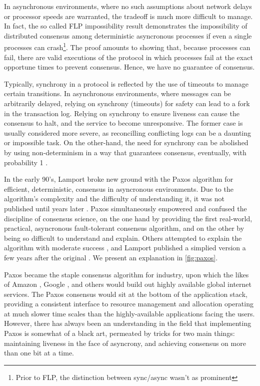 In asynchronous environments, where no such assumptions about network delays or processor speeds are warranted,
the tradeoff is much more difficult to manage.
In fact, the so called FLP impossibility result demonstrates the impossibility of distributed consensus among deterministic asyncronous processes if even a single processes can crash\footnote{Prior to FLP, the distinction between sync/async wasn't as prominent}.
The proof amounts to showing that, because processes can fail, 
there are valid executions of the protocol in which processes fail at the exact opportune times to prevent consensus.
Hence, we have no guarantee of consensus.

Typically, synchrony in a protocol is reflected by the use of timeouts to manage certain transitions.
In asynchronous environments, where messages can be arbitrarily delayed, relying on synchrony (timeouts) for safety
can lead to a fork in the transaction log.
Relying on synchrony to ensure liveness can cause the consensus to halt, and the service to become unresponsive.
The former case is usually considered more severe, as reconcilling conflicting logs can be a daunting or impossible task. 
On the other-hand, the need for synchrony can be abolished by using non-determinism in a way that guarantees consensus, eventually, with probability 1 \cite{}.

In the early 90's, Lamport broke new ground with the Paxos algorithm for efficient, deterministic, consensus in asyncronous environments.
Due to the algorithm's complexity and the difficulty of understanding it, it was not published until years later \cite{paxos}.
Paxos simultaneously empowered and confused the discipline of consensus science,
on the one hand by providing the first real-world, practical, asyncronous fault-tolerant consensus algorithm,
and on the other by being so difficult to understand and explain.
Others attempted to explain the algorithm with moderate success \cite{}, and Lamport published a simplied version 
a few years after the original \cite{}.
We present an explanation in \ref{fig:paxos}.

Paxos became the staple consensus algorithm for industry, upon which the likes of Amazon \cite{dynamo}, Google \cite{chubby}, and others would build out highly available global internet services.
The Paxos consensus would sit at the bottom of the application stack, providing a consistent interface to resource management and allocation operating at much slower time scales than the highly-available applications facing the users.
However, there has always been an understanding in the field that implementing Paxos is somewhat of a black art,
permeated by tricks for two main things: maintaining liveness in the face of asyncrony, and achieving consensus on more than one bit at a time.

